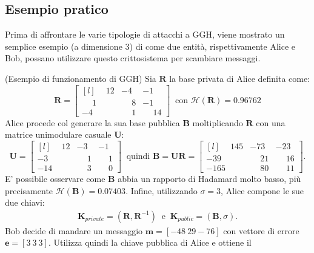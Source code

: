 \subsection{Esempio pratico}
\label{exp:GGH}
Prima di affrontare le varie tipologie di attacchi a GGH, viene mostrato un semplice esempio
(a dimensione 3) di come due entità, rispettivamente Alice e Bob, possano utilizzare questo
crittosistema per scambiare messaggi.
\begin{exmp} (Esempio di funzionamento di GGH)
Sia $\mathbf{R}$ la base privata di Alice definita come:
\begin{equation*}
    \mathbf{R} =
    \begin{bmatrix*}[l]
        \phantom{-}12 & -4 & -1\\
        \phantom{-}1 & \phantom{-}8 & -1\\
        -4 & \phantom{-}1 & \phantom{-}14
    \end{bmatrix*}
    \ \text{ con } \mathcal{H}(\mathbf{R}) = 0.96762
\end{equation*}
Alice procede col generare la sua base pubblica $\mathbf{B}$ moltiplicando $\mathbf{R}$ con una matrice
unimodulare casuale $\mathbf{U}$:
\begin{equation*}
    \mathbf{U} =
    \begin{bmatrix*}[l]
        \phantom{-}12 & -3 & -1\\
        -3 & \phantom{-}1 & \phantom{-}1\\
        -14 & \phantom{-}3 & \phantom{-}0
    \end{bmatrix*}
    \ \text{ quindi } \mathbf{B}=\mathbf{U}\mathbf{R} =
    \begin{bmatrix*}[l]
        \phantom{-}145 & -73 & -23\\
        -39  & \phantom{-}21 & \phantom{-}16\\
        -165  & \phantom{-}80 & \phantom{-}11
    \end{bmatrix*}.
\end{equation*}
E' possibile osservare come $\mathbf{B}$ abbia un rapporto di Hadamard molto basso, più 
precisamente $\mathcal{H}(\mathbf{B}) = 0.07403$. Infine, utilizzando $\sigma = 3$, 
Alice compone le sue due chiavi:
\begin{gather*}
    \mathbf{K}_{private} = (\mathbf{R}, \mathbf{R}^{-1}) 
    \ \text{ e } \  
    \mathbf{K}_{public} = (\mathbf{B}, \sigma).
\end{gather*}
Bob decide di mandare un messaggio $\mathbf{m} = [-48 \ 29 -76]$ con vettore di errore
$\mathbf{e} = [3 \ 3 \ 3]$. Utilizza quindi la chiave pubblica di Alice e ottiene il 

\end{exmp}
